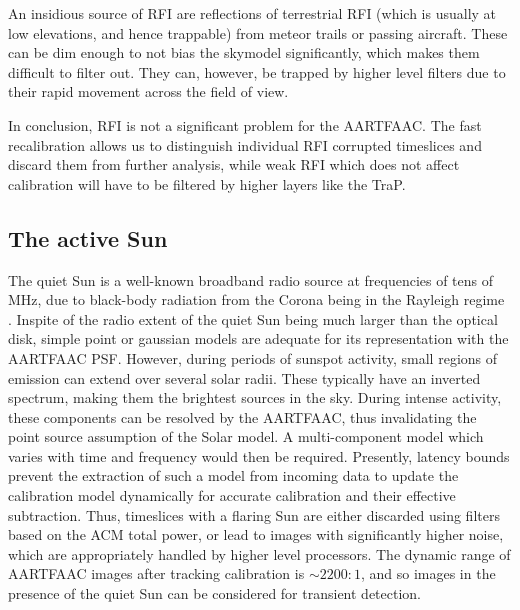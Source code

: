 \documentclass{aa}
\begin{document}
An insidious source of RFI are  reflections of terrestrial RFI (which is usually
at  low  elevations,  and  hence   trappable)  from  meteor  trails  or  passing
aircraft. These can be dim enough  to not bias the skymodel significantly, which
makes them  difficult to  filter out.  They can, however,  be trapped  by higher
level filters due to their rapid movement across the field of view.

In conclusion,  RFI is  not a  significant problem for  the AARTFAAC.   The fast
recalibration allows  us to distinguish individual RFI  corrupted timeslices and
discard  them  from further  analysis,  while weak  RFI  which  does not  affect
calibration will have to be filtered by higher layers like the TraP.


\subsection{The active Sun}

The quiet Sun  is a well-known broadband radio source at  frequencies of tens of
MHz, due to black-body radiation from  the Corona being in the Rayleigh regime .
Inspite of the radio extent of the  quiet Sun being much larger than the optical
disk, simple point  or gaussian models are adequate  for its representation with
the AARTFAAC PSF.  However, during periods of sunspot activity, small regions of
emission can extend  over several solar radii. These  typically have an inverted
spectrum, making them the brightest sources in the sky. During intense activity,
these components  can be resolved by  the AARTFAAC, thus  invalidating the point
source assumption of the Solar  model. A multi-component model which varies with
time and frequency would then be required. Presently, latency bounds prevent the
extraction of  such a model from  incoming data to update  the calibration model
dynamically  for accurate  calibration and  their effective  subtraction.  Thus,
timeslices with  a flaring Sun are  either discarded using filters  based on the
ACM total  power, or lead to  images with significantly higher  noise, which are
appropriately handled by higher level  processors. The dynamic range of AARTFAAC
images after tracking calibration is $\sim2200:1$, and so images in the presence
of the quiet Sun can be considered for transient detection.
\end{document}
